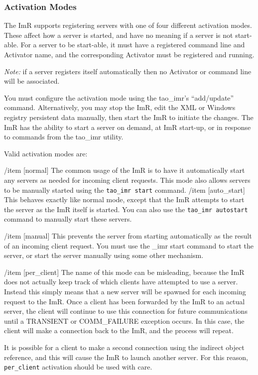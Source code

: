 \subsubsection{Activation Modes}

The ImR supports registering servers with one of four different activation modes.
These affect how a server is started, and have no meaning if a server is not start-able.
For a server to be start-able, it must have a registered command line and Activator
name, and the corresponding Activator must be registered and running.

\emph {Note:} if a server registers itself automatically then no Activator or command
line will be associated.

You must configure the activation mode using the tao\_imr's “add/update” command.
Alternatively, you may stop the ImR, edit the XML or Windows registry persistent
data manually, then start the ImR to initiate the changes. The ImR has the ability to
start a server on demand, at ImR start-up, or in response to commands from the
tao\_imr utility.

Valid activation modes are:
\begin{description}
    /item [normal]
             The common usage of the ImR is to have it automatically start any servers
              as needed for incoming client requests. This mode also allows servers to
              be manually started using the {\tt tao\_imr start} command.
   /item [auto_start]
             This behaves exactly like normal mode, except that the ImR attempts
              to start the server as the ImR itself is started. You can also use the
              {\tt tao\_imr autostart} command to manually start these servers.

   /item [manual]
             This prevents the server from starting automatically as the result of an
              incoming client request. You must use the {\tttao\_imr start} command to start
              the server, or start the server manually using some other mechanism.

   /item [per_client]
            The name of this mode can be misleading, because the ImR does not
             actually keep track of which clients have attempted to use a server.
             Instead this simply means that a new server will be spawned for each
             incoming request to the ImR. Once a client has been forwarded by
             the ImR to an actual server, the client will continue to use this connection
             for future communications until a TRANSIENT or COMM_FAILURE
             exception occurs. In this case, the client will make a connection back to
             the ImR, and the process will repeat.

             It is possible for a client to make a second connection using the indirect
            object reference, and this will cause the ImR to launch another server.
            For this reason, {\tt per_client} activation should be used with care.
\end{description}

